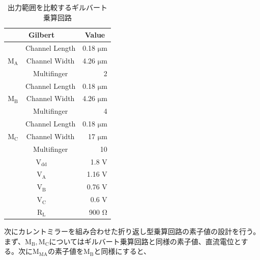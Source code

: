             \begin{table}[!b]
                \centering
                \caption{出力範囲を比較するギルバート乗算回路}
                \label{table:3_prev_com_param}
                \begin{tabular}{c|c|r}
                            \hline
                            \multicolumn{2}{c}{Gilbert}   & \multicolumn{1}{c}{Value}     \\
                            \hline\hline
                            &   Channel Length   &   0.18 $\mathrm{\mu m}$   \\
                            \cline{2-3}
                            $\mathrm{M_{A}}$   &   Channel Width   &   4.26 $\mathrm{\mu m}$   \\
                            \cline{2-3}
                                &   Multifinger   & 2    \\
                            \hline
                            &   Channel Length   &   0.18 $\mathrm{\mu m}$   \\
                            \cline{2-3}
                            $\mathrm{M_{B}}$   &   Channel Width   &   4.26 $\mathrm{\mu m}$   \\
                            \cline{2-3}
                                &   Multifinger   & 4    \\
                            \hline
                            &   Channel Length   &   0.18 $\mathrm{\mu m}$   \\
                            \cline{2-3}
                            $\mathrm{M_{C}}$   &   Channel Width   &   17 $\mathrm{\mu m}$   \\
                            \cline{2-3}
                                &   Multifinger   & 10    \\
                            \hline
                            \multicolumn{2}{c|}{$\mathrm{V_{dd}}$} &   1.8 $\mathrm{V}$   \\
                            \hline
                            \multicolumn{2}{c|}{$\mathrm{V_{A}}$} &   1.16 $\mathrm{V}$   \\
                            \hline
                            \multicolumn{2}{c|}{$\mathrm{V_{B}}$} &   0.76 $\mathrm{V}$   \\
                            \hline
                            \multicolumn{2}{c|}{$\mathrm{V_{C}}$} &   0.6 $\mathrm{V}$   \\
                            \hline
                            \multicolumn{2}{c|}{$\mathrm{R_{L}}$} &   900 $\mathrm{\Omega}$   \\
                            \hline
                \end{tabular}
            \end{table}
            次にカレントミラーを組み合わせた折り返し型乗算回路の素子値の設計を行う。まず、$\mathrm{M_{B},M_{C}}$についてはギルバート乗算回路と同様の素子値、直流電位とする。次に$\mathrm{M_{MA}}$の素子値を$\mathrm{M_{B}}$と同様にすると、
            


